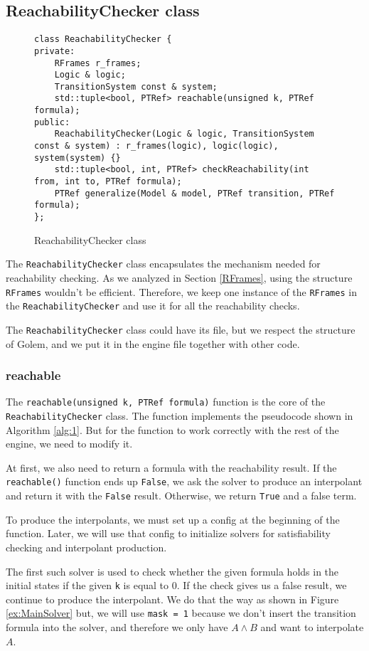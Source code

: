\subsection{ReachabilityChecker class}
\begin{figure}[H]
\begin{lstlisting}
class ReachabilityChecker {
private:
    RFrames r_frames;
    Logic & logic;
    TransitionSystem const & system;
    std::tuple<bool, PTRef> reachable(unsigned k, PTRef formula);
public:
    ReachabilityChecker(Logic & logic, TransitionSystem const & system) : r_frames(logic), logic(logic), system(system) {}
    std::tuple<bool, int, PTRef> checkReachability(int from, int to, PTRef formula);
    PTRef generalize(Model & model, PTRef transition, PTRef formula);
};
\end{lstlisting}
\caption{ReachabilityChecker class}\label{code:ReachClass}
\end{figure}
The \texttt{ReachabilityChecker} class encapsulates the mechanism needed for reachability checking.
\noindent As we analyzed in Section \ref{RFrames}, using the structure \texttt{RFrames} wouldn't be efficient. Therefore, we keep one instance of the \texttt{RFrames} in the \texttt{ReachabilityChecker} and use it for all the reachability checks. 

The \texttt{ReachabilityChecker} class could have its file, but we respect the structure of Golem, and we put it in the engine file together with other code.
\subsubsection{reachable}
The \texttt{reachable(unsigned k, PTRef formula)} function is the core of the \texttt{ReachabilityChecker} class. The function implements the pseudocode shown in Algorithm \ref{alg:1}. But for the function to work correctly with the rest of the engine, we need to modify it.

At first, we also need to return a formula with the reachability result. If the \texttt{reachable()} function ends up \texttt{False}, we ask the solver to produce an interpolant and return it with the \texttt{False} result. Otherwise, we return \texttt{True} and a false term.

To produce the interpolants, we must set up a config at the beginning of the function. Later, we will use that config to initialize solvers for satisfiability checking and interpolant production. 

The first such solver is used to check whether the given formula holds in the initial states if the given \texttt{k} is equal to 0. If the check gives us a false result, we continue to produce the interpolant. We do that the way as shown in Figure \ref{ex:MainSolver} but, we will use \texttt{mask = 1} because we don't insert the transition formula into the solver, and therefore we only have $A \wedge B$ and want to interpolate $A$. 

